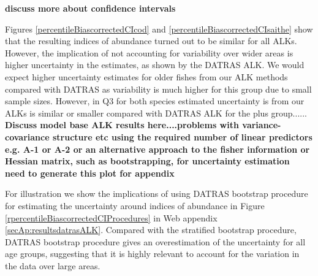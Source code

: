 \documentclass[a4paper 12pt]{article}
\numberwithin{equation}{section}
\begin{document}
{\bf discuss more about confidence intervals}



Figures \ref{percentileBiascorrectedCIcod} and  \ref{percentileBiascorrectedCIsaithe} show that the resulting indices of abundance turned out to be similar for all ALKs. However, the implication of not accounting for variability over wider areas is higher  uncertainty in the estimates, as shown by the DATRAS ALK. We would expect higher uncertainty estimates for older fishes from our ALK methods compared with DATRAS as variability is much higher for this group due to small sample sizes. However, in Q3 for both species estimated uncertainty is from our ALKs is similar or smaller compared with DATRAS ALK for the plus group......\\

{\bf Discuss model base ALK results here....problems with variance-covariance structure etc using the required number of linear predictors e.g. A-1 or A-2 or an alternative approach to the fisher information or Hessian matrix, such as bootstrapping, for uncertainty estimation}\\

{\bf need to generate this plot for appendix}

For illustration we show the implications of using DATRAS bootstrap procedure for estimating the uncertainty around indices of abundance  in Figure \ref{rpercentileBiascorrectedCIProcedures} in Web appendix \ref{secAp:resultsdatrasALK}. Compared with the stratified bootstrap procedure, DATRAS bootstrap procedure gives an overestimation of the uncertainty for all age groups, suggesting that it is highly relevant to account for the variation in the data over large areas. 


\clearpage
\end{document}
